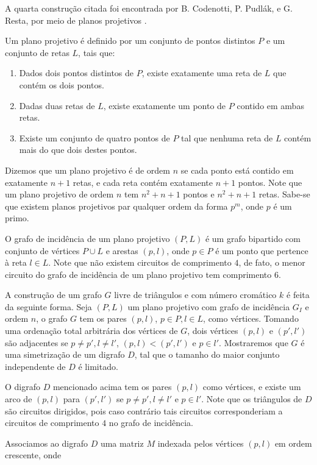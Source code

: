 A quarta construção citada foi encontrada por B. Codenotti, P. Pudlák, e G. Resta, por meio de planos projetivos \cite{codenotti2000some}.

Um plano projetivo é definido por um conjunto de pontos distintos $P$  e um conjunto de retas $L$, tais que:

\begin{enumerate}
\item Dados dois pontos distintos de $P$, existe exatamente uma reta de $L$ que contém os dois pontos. 
\item Dadas duas retas de $L$, existe exatamente um ponto de $P$ contido em ambas retas.
\item Existe um conjunto de quatro pontos de $P$ tal que nenhuma reta de $L$ contém mais do que dois destes pontos.
\end{enumerate}

Dizemos que um plano projetivo é de ordem $n$ se cada ponto está contido em exatamente $n+1$ retas, e cada reta contém exatamente $n+1$ pontos. Note que um plano projetivo de ordem $n$ tem $n^2 + n + 1$ pontos e $n^2 + n + 1$ retas. Sabe-se que existem planos projetivos par qualquer ordem da forma $p^m$, onde $p$ é um primo.

O grafo de incidência de um plano projetivo $(P,L)$ é um grafo bipartido com conjunto de vértices $P \cup L$ e arestas $(p,l)$, onde $p\in P$ é um ponto que pertence à reta $l \in L$. Note que não existem circuitos de comprimento $4$, de fato, o menor circuito do grafo de incidência de um plano projetivo tem comprimento $6$.

A construção de um grafo $G$ livre de triângulos e com número cromático $k$ é feita da seguinte forma. Seja $(P,L)$ um plano projetivo com grafo de incidência $G_I$ e ordem $n$, o grafo $G$ tem os pares $(p,l)$, $p\in P, l\in L$, como vértices. Tomando uma ordenação total arbitrária dos vértices de $G$, dois vértices $(p,l)$ e $(p',l')$ são adjacentes se $p \neq p', l \neq l'$, $(p,l) < (p',l')$ e $p \in l'$. Mostraremos que $G$ é uma simetrização de um digrafo $D$, tal que o tamanho do maior conjunto independente de $D$ é limitado.

O digrafo $D$ mencionado acima tem os pares $(p,l)$ como vértices, e existe um arco de $(p,l)$ para $(p',l')$ se $p \neq p', l \neq l'$ e $p\in l'$. Note que os triângulos de $D$ são circuitos dirigidos, pois caso contrário tais circuitos corresponderiam a circuitos de comprimento $4$ no grafo de incidência.

Associamos ao digrafo $D$ uma matriz $M$ indexada pelos vértices $(p,l)$ em ordem crescente, onde

